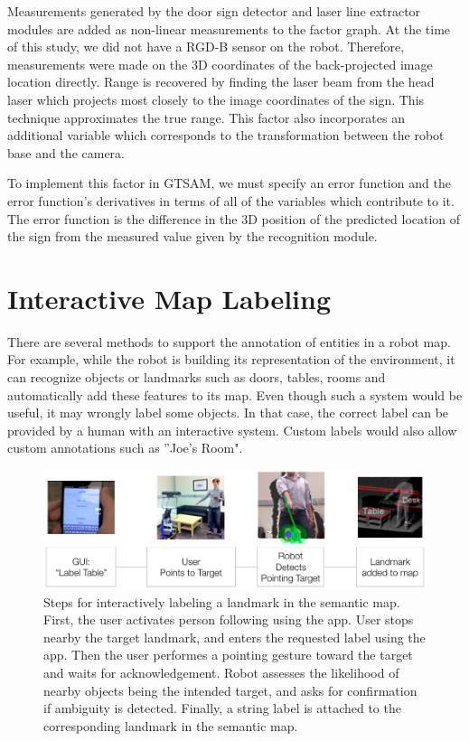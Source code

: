 \documentclass{tADR2e}
\begin{document}
Measurements generated by the door sign detector and laser line extractor modules are added as non-linear measurements to the factor graph. At the time of this study, we did not have a RGD-B sensor on the robot. Therefore, measurements were made on the 3D coordinates of the back-projected image location directly. Range is recovered by finding the laser beam from the head laser which
projects most closely to the image coordinates of the sign. This technique approximates the true range. This factor also incorporates an additional variable which corresponds
to the transformation between the robot base and the camera. 

To implement this factor in GTSAM, we must specify an error function and the
error function’s derivatives in terms of all of the variables which contribute to it. The
error function is the difference in the 3D position of the predicted location of the sign
from the measured value given by the recognition module. 

\section{Interactive Map Labeling}
\label{sec:interactive_map_labeling}

There are several methods to support the annotation of entities in a robot map. For example, while the robot is building its representation of the environment, it can recognize objects or landmarks such as doors, tables, rooms and automatically add these features to its map. Even though such a system would be useful, it may wrongly label some objects. In that case, the correct label can be provided by a human with an interactive system. Custom labels would also allow custom annotations such as ''Joe's Room".


\begin{figure}[ht!]
\begin{center}
\centering
\includegraphics[width=\textwidth]{pics/labeling_flow}
\caption{Steps for interactively labeling a landmark in the semantic map. First, the user activates person following using the app. User 
stops nearby the target landmark, and enters the requested label using the app. Then the user performes a pointing gesture toward the target and waits for acknowledgement. Robot assesses the likelihood of nearby objects being the intended target, and asks for confirmation if ambiguity is detected. Finally, a string label is attached to the corresponding landmark in the semantic map.} 
\label{fig:labeling_flow}
\end{center}
\end{figure}
\end{document}
